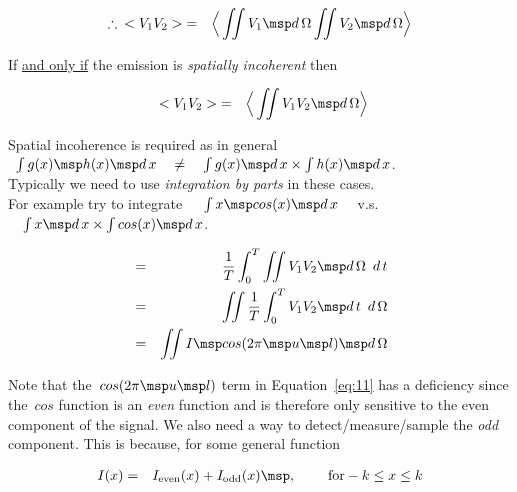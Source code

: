 \begin{eqnarray}
  \label{eq:9}
  \therefore \enspace <V_1V_2> &=& \Big \langle \iint V_1 \msp d\,\Omega \iint V_2 \msp d\,\Omega \Big \rangle \nonumber
\end{eqnarray}

If \underline{and only if} the emission is \emph{spatially incoherent} then

\begin{eqnarray}
  \label{eq:19}
  \enspace <V_1V_2> &=& \Big \langle \iint V_1V_2 \msp d\,\Omega \Big \rangle \nonumber
\end{eqnarray}

\begin{braced}
  Spatial incoherence is required as in general~$\enspace \int g(x) \msp h(x) \msp d\,x \quad \neq \quad \int g(x) \msp d\,x \times \int h(x) \msp d\,x$.\\
  Typically we need to use \emph{integration by parts} in these cases.\\ For example try to integrate~$\quad \int x \msp cos(x) \msp d\,x \quad $ v.s.~$\quad \int x \msp d\,x \times \int cos(x) \msp d\,x$.
\end{braced}

\begin{eqnarray}
  \label{eq:11}
    &=& \frac{1}{T} \int _0 ^T \iint V_1 V_2 \msp d\,\Omega \enspace d\,t \nonumber \\
    &=& \iint \frac{1}{T} \int _0 ^T V_1 V_2 \msp d\,t \enspace d\,\Omega \nonumber \\
    &=& \iint I \msp cos(2\pi \msp u \msp l) \msp d\,\Omega
\end{eqnarray}

Note that the~$cos(2\pi \msp u \msp l)$ term in Equation~\eqref{eq:11} has a deficiency since the~$cos$ function is an \emph{even} function and is therefore only sensitive to the even component of the signal. We also need a way to detect/measure/sample the \emph{odd} component. This is because, for some general function

\begin{eqnarray}
  \label{eq:12}
  I(x) &=& I_{\mbox{\scriptsize even}}(x) + I_{\mbox{\scriptsize odd}}(x) \msp , \hspace{0.8cm} \mbox{for} -k \leq x \leq k \nonumber
\end{eqnarray}

